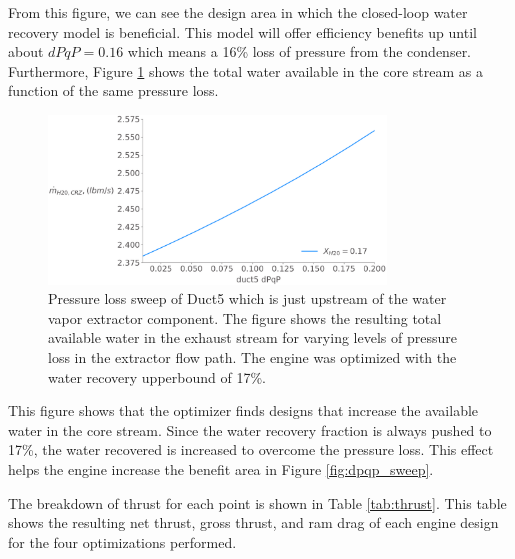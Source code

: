 \documentclass[conf]{new-aiaa}
\begin{document}
From this figure, we can see the design area in which the closed-loop water recovery model is beneficial.
This model will offer efficiency benefits up until about $dPqP = 0.16$ which means a 16\% loss of pressure from the condenser.
Furthermore, Figure \ref{fig:dpqp_wdot} shows the total water available in the core stream as a function of the same pressure loss.

\begin{figure}[hbt!]
    \centering
    \includegraphics[width=0.8\textwidth]{N3_wdot.pdf}
    \caption{Pressure loss sweep of Duct5 which is just upstream of the water vapor extractor component.
        The figure shows the resulting total available water in the exhaust stream for varying levels of pressure loss in the extractor flow path.
        The engine was optimized with the water recovery upperbound of 17\%.
    }
    \label{fig:dpqp_wdot}
\end{figure}

This figure shows that the optimizer finds designs that increase the available water in the core stream.
Since the water recovery fraction is always pushed to 17\%, the water recovered is increased to overcome the pressure loss.
This effect helps the engine increase the benefit area in Figure \ref{fig:dpqp_sweep}.

The breakdown of thrust for each point is shown in Table \ref{tab:thrust}.
This table shows the resulting net thrust, gross thrust, and ram drag of each engine design for the four optimizations performed.
\end{document}
